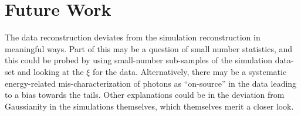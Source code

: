 \documentclass[main.tex]{subfiles}
\begin{document}
\section{Future Work}

The data reconstruction deviates from the simulation reconstruction in meaningful ways. Part of this may be a question of small number statistics, and this could be probed by using small-number sub-samples of the simulation data-set and looking at the $\xi$ for the data. Alternatively, there may be a systematic energy-related mis-characterization of photons as ``on-source'' in the data leading to a bias towards the tails. Other explanations could be in the deviation from Gaussianity in the simulations themselves, which themselves merit a closer look.
\end{document}
